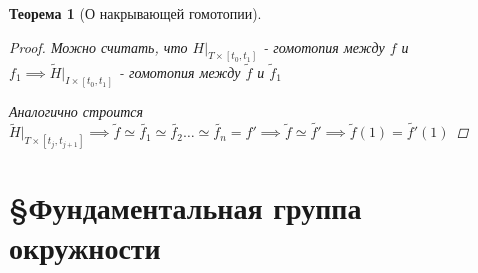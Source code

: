 \documentclass[a4paper]{article}
\newtheorem*{theorem}{Теорема}
\theoremstyle{definition}
\theoremstyle{remark}
\begin{document}
\begin{tcolorbox}
\begin{theorem}[О накрывающей гомотопии]
\begin{proof}
            Можно считать, что $ H|_{T \times [t_0, t_1]} $ - гомотопия между
            $ f $ и $ f_1 \implies \widetilde{H}|_{I \times [t_0, t_1]} $ -
            гомотопия между $ \widetilde{f} $ и $ \widetilde{f}_1 $  

            Аналогично строится $ \widetilde{H}|_{T \times [t_j, t_{j+1}]} \implies
            \widetilde{f} \simeq \widetilde{f_1} \simeq \widetilde{f_2} \dots
            \simeq \widetilde{f_n} = f' \implies \widetilde{f} \simeq \widetilde{f'}
            \implies \widetilde{f}(1) = \widetilde{f'}(1)$ 
        \end{proof}
    \end{theorem}
\end{tcolorbox}

\section*{\centering \S Фундаментальная группа окружности}
\end{document}
